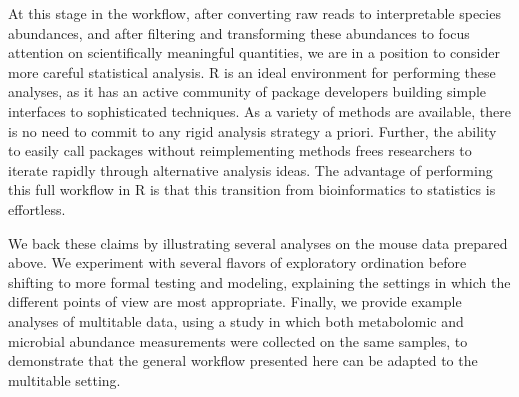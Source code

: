 At this stage in the workflow, after converting raw reads to
interpretable species abundances, and after filtering and transforming
these abundances to focus attention on scientifically meaningful
quantities, we are in a position to consider more careful statistical
analysis. R is an ideal environment for performing these analyses, as
it has an active community of package developers building simple
interfaces to sophisticated techniques. As a variety of methods are
available, there is no need to commit to any rigid analysis strategy a
priori. Further, the ability to easily call packages without
reimplementing methods frees researchers to iterate rapidly through
alternative analysis ideas. The advantage of performing this full
workflow in R is that this transition from bioinformatics to
statistics is effortless.

We back these claims by illustrating several analyses on the mouse
data prepared above. We experiment with several flavors of exploratory
ordination before shifting to more formal testing and modeling,
explaining the settings in which the different points of view are most
appropriate. Finally, we provide example analyses of multitable data,
using a study in which both metabolomic and microbial abundance
measurements were collected on the same samples, to demonstrate that
the general workflow presented here can be adapted to the multitable
setting.



